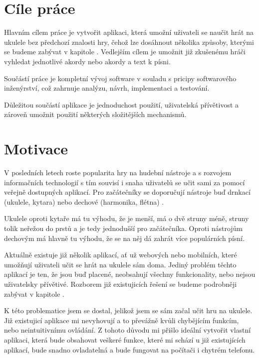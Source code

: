 \begin{introduction}
    \label{ch:introduction}
    \section{Cíle práce}
    Hlavním cílem práce je vytvořit aplikaci, která umožní uživateli se naučit hrát na ukulele bez předchozí znalosti hry, čehož lze dosáhnout několika způsoby, kterými se budeme zabývat v kapitole . Vedlejším cílem je umožnit již zkušenému hráči vyhledat jednotlivé akordy nebo akordy a text k písni.

    Součástí práce je kompletní vývoj software v souladu s pricipy softwarového inženýrství, což zahrnuje analýzu, návrh, implementaci a testování.

    Důležitou součástí aplikace je jednoduchost použití, uživatelská přívětivost a zároveň umožnit použití některých složitějších mechanismů.
    
    \section{Motivace}
    V posledních letech roste popularita hry na hudební nástroje a s rozvojem informačních technologií s tím souvisí i snaha uživatelů se učit sami za pomocí veřejně dostupných aplikací. Pro začátečníky se doporučují nástroje buď drnkací (ukulele, kytara) nebo dechové (harmonika, flétna)\cite{s_2016_the} \cite{richardson_2019_top}.
    
    Ukulele oproti kytaře má tu výhodu, že je menší, má o dvě struny méně, struny tolik neřežou do prstů a je tedy jednodušší pro začátečníka. Oproti nástrojům dechovým má hlavně tu výhodu, že se na něj dá zahrát více populárních písní.

    Aktuálně existuje již několik aplikací, ať už webových nebo mobilních, které umožňují uživateli učit se hrát na ukulele sám doma. Jediný problém těchto aplikací je ten, že jsou buď placené, neobsahují všechny funkcionality, nebo nejsou uživatelsky přívětivé. Rozborem již existujicích řešení se budeme podrobněji zabývat v kapitole .

    K této problematice jsem se dostal, jelikož jsem se sám začal učit hru na ukulele. Již existujicí aplikace mi nevyhovují a to převážně kvůli chybějícím funkcím, nebo neintuitivnímu ovládání. Z tohoto důvodu mi přišlo ideální vytvořit vlastní aplikaci, která bude obsahovat veškeré funkce, které mi schází u již existujících aplikací, bude snadno ovladatelná a bude fungovat na počítači i chytrém telefonu.


\end{introduction}
